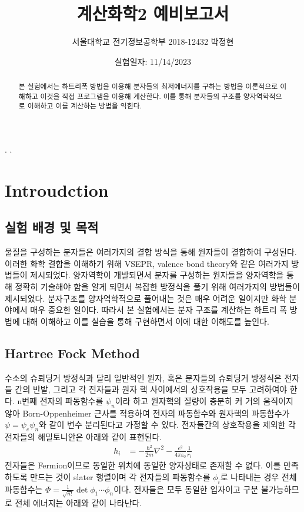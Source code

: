 \documentclass[%
 reprint,
 amsmath,amssymb,
 aps,
]{revtex4-2}
\begin{document}
\title{계산화학2 예비보고서}

\author{서울대학교 전기정보공학부 2018-12432 박정현}
\date{실험일자: 11/14/2023}%

\begin{abstract}
본 실험에서는 하트리폭 방법을 이용해 분자들의 최저에너지를 구하는 방법을 이론적으로 이해하고 이것을 직접 프로그램을 이용해 계산한다. 이를 통해 분자들의 구조를 양자역학적으로 이해하고 이를 계산하는 방법을 익힌다. 
\end{abstract}
\maketitle
.\newpage
.\newpage

\section{\label{sec:level1}Introudction}
\subsection{\label{sec:level2}실험 배경 및 목적}
물질을 구성하는 분자들은 여러가지의 결합 방식을 통해 원자들이 결합하여 구성된다. 이러한 화학 결합을 이해하기 위해 VSEPR, valence bond theory와 같은 여러가지 방법들이 제시되었다. 양자역학이 개발되면서 분자를 구성하는 원자들을 양자역학을 통해 정확히 기술해야 함을 알게 되면서 복잡한 방정식을 풀기 위해 여러가지의 방법들이 제시되었다. 분자구조를 양자역학적으로 풀어내는 것은 매우 어려운 일이지만 화학 분야에서 매우 중요한 일이다. 따라서 본 실험에서는 분자 구조를 계산하는 하트리 폭 방법에 대해 이해하고 이를 실습을 통해 구현하면서 이에 대한 이해도를 높인다.

\subsection{\label{sec:level2}Hartree Fock Method}
수소의 슈뢰딩거 방정식과 달리 일반적인 원자, 혹은 분자들의 슈뢰딩거 방정식은 전자들 간의 반발, 그리고 각 전자들과 원자 핵 사이에서의 상호작용을 모두 고려하여야 한다. n번째 전자의 파동함수를 $\psi_{n}$이라 하고 원자핵의 질량이 충분히 커 거의 움직이지 않아 Born-Oppenheimer 근사를 적용하여 전자의 파동함수와 원자핵의 파동함수가 $\psi = \psi_{e}\psi_{n}$와 같이 변수 분리된다고 가정할 수 있다. 전자들간의 상호작용을 제외한 각 전자들의 해밀토니안은 아래와 같이 표현된다.
\begin{align}
	h_{i} &= -\frac{\hbar^{2}}{2m}\nabla^{2} - \frac{e^{2}}{4\pi\varepsilon_{0}}\frac{1}{r_{i}}
\end{align}
전자들은 Fermion이므로 동일한 위치에 동일한 양자상태로 존재할 수 없다. 이를 만족하도록 만드는 것이 slater 행렬이며 각 전자들의 파동함수를 $\phi_{i}$로 나타내는 경우 전체 파동함수는 $\Phi = \frac{1}{\sqrt{n!}}\det{\phi_{1}\cdots\phi_{n}}$이다. 전자들은 모두 동일한 입자이고 구분 불가능하므로 전체 에너지는 아래와 같이 나타난다.
\end{document}
